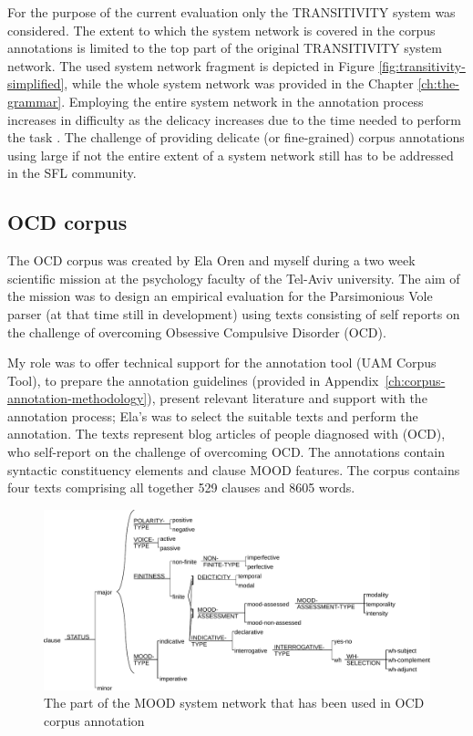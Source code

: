     For the purpose of the current evaluation only the TRANSITIVITY system was considered. The extent to which the system network is covered in the corpus annotations is limited to the top part of the original TRANSITIVITY system network. The used system network fragment is depicted in Figure \ref{fig:transitivity-simplified}, while the whole system network was provided in the Chapter \ref{ch:the-grammar}. Employing the entire system network in the annotation process increases in difficulty as the delicacy increases due to the time needed to perform the task \citep[33]{mcenery2006corpus}. The challenge of providing delicate (or fine-grained) corpus annotations using large if not the entire extent of a system network still has to be addressed in the SFL community. 

\subsection{OCD corpus}

     The OCD corpus was created by Ela Oren and myself during a two week scientific mission at the psychology faculty of the Tel-Aviv university. The aim of the mission was to design an empirical evaluation for the Parsimonious Vole parser (at that time still in development) using texts consisting of self reports on the challenge of overcoming Obsessive Compulsive Disorder (OCD).
     
     My role was to offer technical support for the annotation tool (UAM Corpus Tool), to prepare the annotation guidelines (provided in \mbox{Appendix \ref{ch:corpus-annotation-methodology}}), present relevant literature and support with the annotation process; Ela's was to select the suitable texts and perform the annotation. The texts represent blog articles of people diagnosed with (OCD), who self-report on the challenge of overcoming OCD. The annotations contain syntactic constituency elements and clause MOOD features. The corpus contains four texts comprising all together 529 clauses and 8605 words. 

    \begin{figure}[!h]
        \centering
        \includegraphics[width=.85\textwidth]{Figures/Evaluation/ocd1-mood-simplified.pdf}
        \caption{The part of the MOOD system network that has been used in OCD corpus annotation}
        \label{fig:mood-ocd-simplified}
    \end{figure}
    

